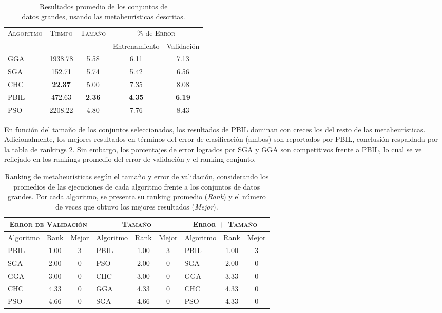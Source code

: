 \begin{table}[h!]
\centering
\begin{tabular}{l c c c c}
\hline
\multirow{2}{*}{\textsc{Algoritmo}}
	& \multirow{2}{*}{\textsc{Tiempo}}
	& \multirow{2}{*}{\textsc{Tamaño}}
	& \multicolumn{2}{c}{$\%$ de \textsc{Error}} \\\cline{4-5}
 & & & \scriptsize{Entrenamiento} & \scriptsize{Validación} \\
\hline
\hline
GGA  & 1938.78 & 5.58 & 6.11 & 7.13 \\
SGA  &  152.71 & 5.74 & 5.42 & 6.56 \\
CHC  & \textbf{22.37} & 5.00 & 7.35 & 8.08 \\
PBIL &  472.63 & \textbf{2.36} & \textbf{4.35} & \textbf{6.19} \\
PSO  & 2208.22 & 4.80 & 7.76 & 8.43 \\
\hline
\end{tabular}
\caption[Resultados de metaheurísticas usando conjuntos de datos grandes]{Resultados promedio de los conjuntos de\\datos grandes, usando las metaheurísticas descritas.}
\label{res-big}
\end{table}

En función del tamaño de los conjuntos seleccionados, los resultados de PBIL dominan con creces los del resto de las metaheurísticas. Adicionalmente, los mejores resultados en términos del error de clasificación (ambos) son reportados por PBIL, conclusión respaldada por la tabla de rankings \ref{res-big-rank}. Sin embargo, los porcentajes de error logrados por SGA y GGA son competitivos frente a PBIL, lo cual se ve reflejado en los rankings promedio del error de validación y el ranking conjunto.

\begin{table}[h!]
\centering
\begin{tabular}{l c c|l c c|l c c}
\hline
\multicolumn{3}{c|}{\textsc{Error de Validación}}
	& \multicolumn{3}{c|}{\textsc{Tamaño}}
	& \multicolumn{3}{c}{\textsc{Error + Tamaño}} \\
\hline
Algoritmo & Rank & Mejor & Algoritmo & Rank & Mejor & Algoritmo & Rank & Mejor \\
\hline
\hline
PBIL & 1.00 & 3 & PBIL & 1.00 & 3 & PBIL & 1.00 & 3 \\
SGA  & 2.00 & 0 & PSO  & 2.00 & 0 & SGA  & 2.00 & 0 \\
GGA  & 3.00 & 0 & CHC  & 3.00 & 0 & GGA  & 3.33 & 0 \\
CHC  & 4.33 & 0 & GGA  & 4.33 & 0 & CHC  & 4.33 & 0 \\
PSO  & 4.66 & 0 & SGA  & 4.66 & 0 & PSO  & 4.33 & 0 \\
\hline
\end{tabular}
\caption[Ranking de metaheurísticas según el tamaño y error de validación en conjuntos de datos grandes]{Ranking de metaheurísticas según el tamaño y error de validación, considerando los promedios de las ejecuciones de cada algoritmo frente a los conjuntos de datos grandes. Por cada algoritmo, se presenta su ranking promedio (\emph{Rank}) y el número de veces que obtuvo los mejores resultados (\emph{Mejor}).}
\label{res-big-rank}
\end{table}

